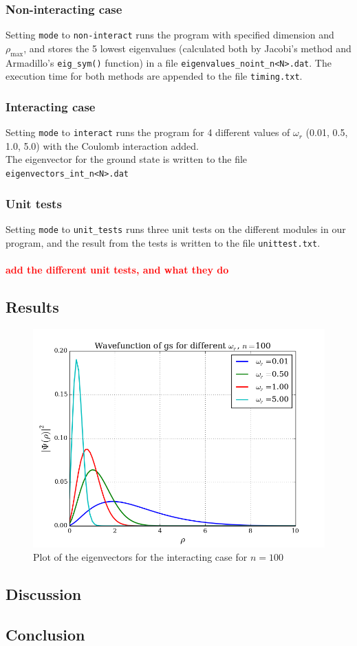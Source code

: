\documentclass{article}
\newcommand\red[1]{\textcolor{red}{\textbf{#1}}}
\begin{document}
\subsubsection{Non-interacting case}
Setting \texttt{mode} to \texttt{non-interact} runs the program with specified dimension and $\rho_{\text{max}}$, and stores the 5 lowest eigenvalues (calculated both by Jacobi's method and Armadillo's \texttt{eig\_sym()} function) in a file \texttt{eigenvalues\_noint\_n<N>.dat}. The execution time for both methods are appended to the file \texttt{timing.txt}.
\subsubsection{Interacting case}
Setting \texttt{mode} to \texttt{interact} runs the program for 4 different values of $\omega_r$ (0.01, 0.5, 1.0, 5.0) with the Coulomb interaction added.\\The eigenvector for the ground state is written to the file \texttt{eigenvectors\_int\_n<N>.dat}
\subsubsection{Unit tests}
Setting \texttt{mode} to \texttt{unit\_tests} runs three unit tests on the different modules in our program, and the result from the tests is written to the file \texttt{unittest.txt}.
\\\\\red{add the different unit tests, and what they do}
\subsection{Results}
\begin{figure}[H]
  \centering
  \includegraphics[scale=0.5]{../figures/eigvec_interact_n100.png}
  \caption{Plot of the eigenvectors for the interacting case for $n=100$}
  \label{fig:eigvec100}
\end{figure}
\subsection{Discussion}

\subsection{Conclusion}

\end{document}
